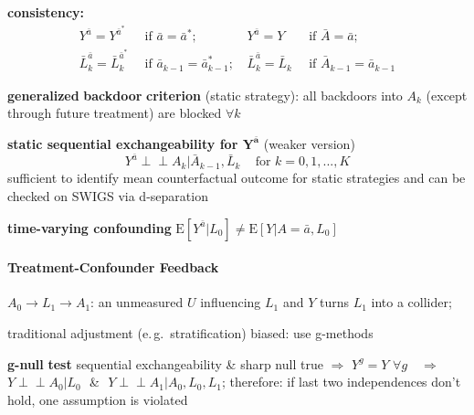 \documentclass[8pt,twoside]{extarticle}
\newcommand{\indep}{\perp \!\!\! \perp}
\begin{document}
\begin{multicols}{2}
{\begin{minipage}{28em}
 \textbf{consistency:} 
\begin{align*}
Y^{\bar{a}} = Y^{\bar{a}^*} & \, \text{ if } {\bar{a}} = {\bar{a}^*};  & \,
Y^{\bar{a}} = Y & \, \text{ if } {\bar{A}} = {\bar{a}};  \\
\bar{L}^{\bar{a}}_k = \bar{L}^{\bar{a}^*}_k & \, \text{ if } {\bar{a}_{k-1}} = {\bar{a}^*_{k-1}}; & \,
\bar{L}^{\bar{a}}_k = \bar{L}_k & \, \text{ if } {\bar{A}_{k-1}} = {\bar{a}_{k-1}}
\end{align*}

\end{minipage}}

\vspace{1.5em}

 \colorbox{lightgray!20!white}{\begin{minipage}{28em}


 \textbf{generalized\,\,backdoor\,\,criterion} (static strategy): all backdoors into $A_k$ (except through future treatment) are blocked $\forall k$ 


 \textbf{static sequential exchangeability for $\boldsymbol{Y^{\bar{a}}}$} (weaker version)
$$Y^{\bar{a}} \indep A_k| \bar{A}_{k-1}, \bar{L}_k \,\,\,\,\, \text{ for } k=0,1,...,K$$
sufficient to identify mean counterfactual outcome for static strategies and can be checked on SWIGS via d-separation

 \textbf{time-varying confounding} $\mathrm{E}\left[Y^{\bar{a}}|L_0\right] \neq \mathrm{E}\left[Y|A=\bar{a}, L_0\right]$


\end{minipage}}

\vspace{1.5em}

 \colorbox{lightgray!20!white}{\begin{minipage}{28em}


\paragraph{Treatment-Confounder Feedback} $A_0 \rightarrow L_1 \rightarrow A_1$: an unmeasured $U$ influencing $L_1$ and $Y$ turns $L_1$ into a collider;

 traditional adjustment (e.\,g.\ stratification) biased: use g-methods

 \textbf{g-null\,\,test} sequential exchangeability \& sharp null true $\Rightarrow$ $Y^g {=} Y \,\, \forall g$ $\,\,\,\,\Rightarrow \,\,\,\,$ $Y {\indep} A_0|L_0\,\,$ \& \,\,$Y {\indep} A_1|A_0, L_0, L_1$;
therefore: \newline if last two independences don't hold, one assumption is violated


\end{minipage}}
\end{multicols}
\end{document}
